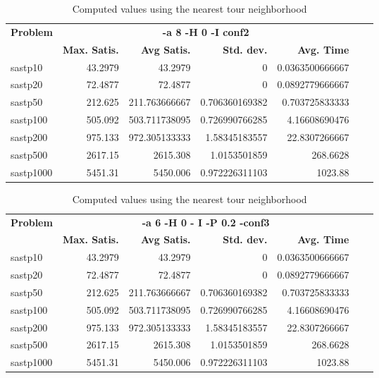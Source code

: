 \documentclass{article}
\begin{document}
\begin{table}[b!]
  \vspace{-6mm}%
  \caption{Computed values using the nearest tour neighborhood}
  \label{tab:NearestTour}
  \setlength{\tabcolsep}{1.4mm}
  \centering
  \begin{tabular}{lrrrrrr}
   \multirow{2}{*}{\bfseries Problem} &
      \multicolumn{4}{c}{\bfseries -a 8 -H 0 -I  conf2} \\
    &
    \bfseries Max. Satis. &
    \bfseries Avg Satis. &
    \bfseries Std. dev. &
    \bfseries Avg. Time 
    \\\hline
    sastp10 & 43.2979 & 43.2979 & 0 & 0.0363500666667 \\ 
sastp20 & 72.4877 & 72.4877 & 0 & 0.0892779666667 \\ 
sastp50 & 212.625 & 211.763666667 & 0.706360169382 & 0.703725833333 \\ 
sastp100 & 505.092 & 503.711738095 & 0.726990766285 & 4.16608690476 \\ 
sastp200 & 975.133 & 972.305133333 & 1.58345183557 & 22.8307266667 \\ 
sastp500 & 2617.15 & 2615.308 & 1.0153501859 & 268.6628 \\ 
sastp1000 & 5451.31 & 5450.006 & 0.972226311103 & 1023.88
    \\\hline
  \end{tabular}

\end{table}


\begin{table}[b!]
  \vspace{-6mm}%
  \caption{Computed values using the nearest tour neighborhood}
  \label{tab:NearestTour}
  \setlength{\tabcolsep}{1.4mm}
  \centering
  \begin{tabular}{lrrrrrr}
   \multirow{2}{*}{\bfseries Problem} &
      \multicolumn{4}{c}{\bfseries -a 6 -H 0 - I -P 0.2 -conf3 } \\
    &
    \bfseries Max. Satis. &
    \bfseries Avg Satis. &
    \bfseries Std. dev. &
    \bfseries Avg. Time 
    \\\hline
    sastp10 & 43.2979 & 43.2979 & 0 & 0.0363500666667 \\ 
sastp20 & 72.4877 & 72.4877 & 0 & 0.0892779666667 \\ 
sastp50 & 212.625 & 211.763666667 & 0.706360169382 & 0.703725833333 \\ 
sastp100 & 505.092 & 503.711738095 & 0.726990766285 & 4.16608690476 \\ 
sastp200 & 975.133 & 972.305133333 & 1.58345183557 & 22.8307266667 \\ 
sastp500 & 2617.15 & 2615.308 & 1.0153501859 & 268.6628 \\ 
sastp1000 & 5451.31 & 5450.006 & 0.972226311103 & 1023.88

    \\\hline
  \end{tabular}

\end{table}
\end{document}
